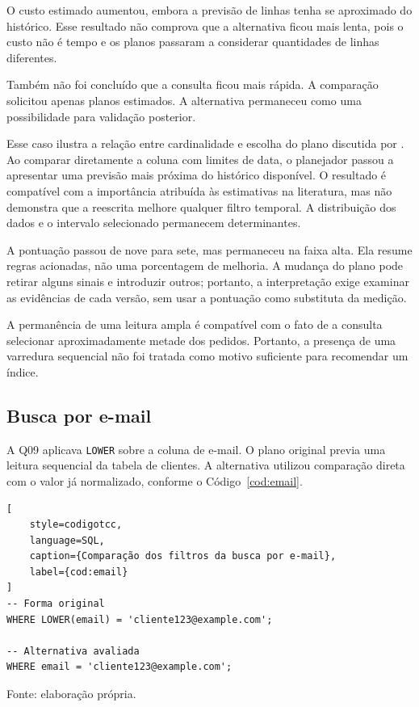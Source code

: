 \documentclass{UNESC}
\newcommand{\codigo}[1]{\texttt{#1}}
\newcommand{\fonteautor}{
    \par\smallskip
    {\footnotesize Fonte: elaboração própria.}
}
\begin{document}
O custo estimado aumentou, embora a previsão de linhas tenha se aproximado do histórico. Esse resultado não comprova que a alternativa ficou mais lenta, pois o custo não é tempo e os planos passaram a considerar quantidades de linhas diferentes.

Também não foi concluído que a consulta ficou mais rápida. A comparação solicitou apenas planos estimados. A alternativa permaneceu como uma possibilidade para validação posterior.

Esse caso ilustra a relação entre cardinalidade e escolha do plano discutida por . Ao comparar diretamente a coluna com limites de data, o planejador passou a apresentar uma previsão mais próxima do histórico disponível. O resultado é compatível com a importância atribuída às estimativas na literatura, mas não demonstra que a reescrita melhore qualquer filtro temporal. A distribuição dos dados e o intervalo selecionado permanecem determinantes.

A pontuação passou de nove para sete, mas permaneceu na faixa alta. Ela resume regras acionadas, não uma porcentagem de melhoria. A mudança do plano pode retirar alguns sinais e introduzir outros; portanto, a interpretação exige examinar as evidências de cada versão, sem usar a pontuação como substituta da medição.

A permanência de uma leitura ampla é compatível com o fato de a consulta selecionar aproximadamente metade dos pedidos. Portanto, a presença de uma varredura sequencial não foi tratada como motivo suficiente para recomendar um índice.

\subsection{Busca por e-mail}

A Q09 aplicava \codigo{LOWER} sobre a coluna de e-mail. O plano original previa uma leitura sequencial da tabela de clientes. A alternativa utilizou comparação direta com o valor já normalizado, conforme o Código~\ref{cod:email}.

\begin{lstlisting}[
    style=codigotcc,
    language=SQL,
    caption={Comparação dos filtros da busca por e-mail},
    label={cod:email}
]
-- Forma original
WHERE LOWER(email) = 'cliente123@example.com';

-- Alternativa avaliada
WHERE email = 'cliente123@example.com';
\end{lstlisting}
\fonteautor
\end{document}
